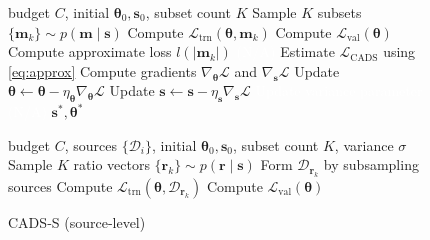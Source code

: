 \begin{figure}[t]  
    \begin{minipage}{0.47\textwidth}  
        \begin{algorithm}[H]  
            \caption{CADS‑E (example‑level)}  
            \label{alg:cads_e}  
            \begin{algorithmic}[1]  
                \REQUIRE budget $C$, initial $\bm{\theta}_{0},\bm{s}_0$, subset count $K$
                    \STATE Sample $K$ subsets $\{\bm{m}_k\}\sim p(\bm{m}\!\mid\!\bm{s})$  
                        \STATE Compute $\mathcal{L}_{\mathrm{trn}}(\bm{\theta}, \bm{m}_k)$  
                        \STATE Compute $\mathcal{L}_{\mathrm{val}}(\bm{\theta})$  
                        \STATE Compute approximate loss $l(|\bm{m}_k|)$
                        \STATE \textcolor{white}{ (N/A)}
                    \ENDFOR  
                    \STATE Estimate $\mathcal{L}_{\text{CADS}}$ using \eqref{eq:approx}  
                    \STATE Compute gradients $\nabla_{\bm{\theta}}\mathcal{L}$ and $\nabla_{\bm{s}}\mathcal{L}$  
                    \STATE Update $\bm{\theta}\leftarrow\bm{\theta}-\eta_{\bm{\theta}}\nabla_{\bm{\theta}}\mathcal{L}$  
                    \STATE Update $\bm{s}\leftarrow \bm{s}-\eta_{\bm{s}}\nabla_{\bm{s}}\mathcal{L}$  
                    \STATE \textcolor{white}{Update variance parameter (N/A)}  
                \ENDWHILE  
                \RETURN $\bm{s}^*, \bm{\theta}^*$  
            \end{algorithmic}  
        \end{algorithm}  
    \end{minipage}  
    \hfill  
    \begin{minipage}{0.5\textwidth}  
        \begin{algorithm}[H]  
            \caption{CADS‑S (source‑level)}  
            \label{alg:cads_s}  
            \begin{algorithmic}[1]  
                \REQUIRE budget $C$, sources $\{\mathcal{D}_{i}\}$, initial $\bm{\theta}_{0},\bm{s}_0$, subset count $K$, variance $\sigma$  
                    \STATE Sample $K$ ratio vectors $\{\bm{r}_k\}\sim p(\bm{r}\!\mid\!\bm{s})$  
                        \STATE Form $\mathcal{D}_{\bm{r}_k}$ by subsampling sources  
                        \STATE Compute $\mathcal{L}_{\mathrm{trn}}(\bm{\theta}, \mathcal{D}_{\bm{r}_k})$  
                        \STATE Compute $\mathcal{L}_{\mathrm{val}}(\bm{\theta})$  

\end{algorithmic}
\end{algorithm}
\end{minipage}
\end{figure}

